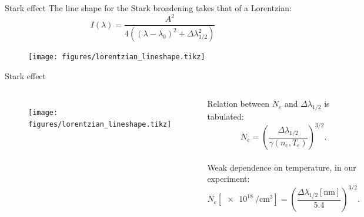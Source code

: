 \documentclass[draft]{beamer}
\begin{document}
  \begin{frame}{Stark effect}
    The line shape for the Stark broadening takes that of a Lorentzian:
    \begin{equation*}
      I\left( \lambda \right)=\frac{A^2}{4\left( \left(\lambda-\lambda_0\right)^2+\Delta \lambda_{1/2}^2\right)}
    \end{equation*}
    \begin{figure}
\texttt{[image: figures/lorentzian\_lineshape.tikz]}
    \end{figure}
\end{frame}
\begin{frame}{Stark effect}
  \begin{columns}
    \begin{figure}
      \texttt{[image: figures/lorentzian\_lineshape.tikz]}
    \end{figure}
    Relation between $N_e$ and $\Delta \lambda_{1/2}$ is tabulated: $$N_e=\left( \frac{\Delta\lambda_{1/2}}{\gamma\left(n_e,T_e\right)}\right)^{3/2}.$$
    \\
    Weak dependence on temperature, in our experiment: $$N_e\left[\SI{e18}{\per\cubic\cm}\right]=\left( \frac{\Delta\lambda_{1/2}\left[\si{\nm}\right]}{5.4}\right)^{3/2}.$$
  \end{columns}
  \end{frame}
\end{document}
